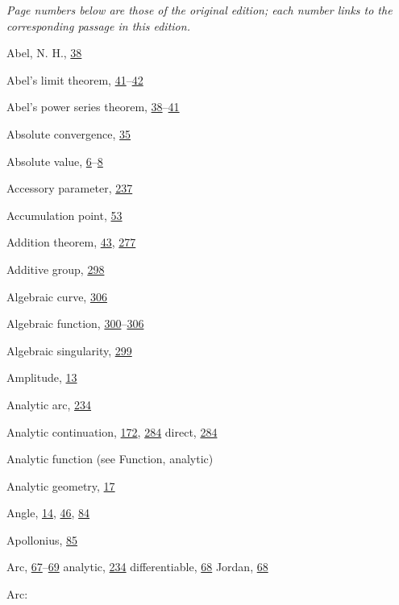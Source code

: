 \begin{theindex}
\item[]\small\textit{Page numbers below are those of the original edition;
each number links to the corresponding passage in this edition.}
\indexspace
\item Abel, N. H., \hyperlink{orig-p38}{38}
\item Abel's limit theorem, \hyperlink{orig-p41}{41}--\hyperlink{orig-p42}{42}
\item Abel's power series theorem, \hyperlink{orig-p38}{38}--\hyperlink{orig-p41}{41}
\item Absolute convergence, \hyperlink{orig-p35}{35}
\item Absolute value, \hyperlink{orig-p6}{6}--\hyperlink{orig-p8}{8}
\item Accessory parameter, \hyperlink{orig-p237}{237}
\item Accumulation point, \hyperlink{orig-p53}{53}
\item Addition theorem, \hyperlink{orig-p43}{43}, \hyperlink{orig-p277}{277}
\item Additive group, \hyperlink{orig-p298}{298}
\item Algebraic curve, \hyperlink{orig-p306}{306}
\item Algebraic function, \hyperlink{orig-p300}{300}--\hyperlink{orig-p306}{306}
\item Algebraic singularity, \hyperlink{orig-p299}{299}
\item Amplitude, \hyperlink{orig-p13}{13}
\item Analytic arc, \hyperlink{orig-p234}{234}
\item Analytic continuation, \hyperlink{orig-p172}{172}, \hyperlink{orig-p284}{284}
\subitem direct, \hyperlink{orig-p284}{284}
\item Analytic function (see Function, analytic)
\item Analytic geometry, \hyperlink{orig-p17}{17}
\item Angle, \hyperlink{orig-p14}{14}, \hyperlink{orig-p46}{46}, \hyperlink{orig-p84}{84}
\item Apollonius, \hyperlink{orig-p85}{85}
\item Arc, \hyperlink{orig-p67}{67}--\hyperlink{orig-p69}{69}
\subitem analytic, \hyperlink{orig-p234}{234}
\subitem differentiable, \hyperlink{orig-p68}{68}
\subitem Jordan, \hyperlink{orig-p68}{68}
\item Arc:

\end{theindex}
